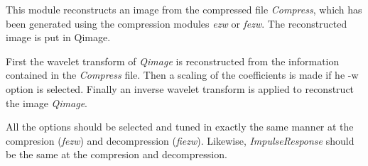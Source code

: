 This module reconstructs an image from the compressed file {\em Compress}, 
which has been generated using the compression modules {\em ezw} 
or {\em fezw}. The reconstructed image is put in Qimage. 

First the wavelet transform of {\em Qimage} is reconstructed from 
the information contained in the {\em Compress} file. 
Then a scaling of the coefficients is made if he -w option is selected. 
Finally an inverse wavelet transform is applied to reconstruct the image
{\em Qimage}. 

All the options should be selected and tuned in exactly the same 
manner at the compresion ({\em fezw}) and decompression ({\em fiezw}). 
Likewise, {\em ImpulseResponse} should be the same 
at the compresion and decompression. 
